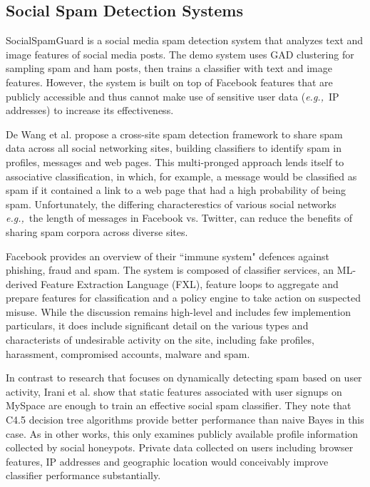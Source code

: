 \documentclass[preprint]{acm_proc_article-sp}
\newcommand{\eg}{{\em e.g.,}~}
\begin{document}
\subsection{Social Spam Detection Systems}

SocialSpamGuard \cite{jin} is a social media spam detection system that analyzes text and image features of social media posts. The demo system uses GAD clustering \cite{jingad} for sampling spam and ham posts, then trains a classifier with text and image features. However, the system is built on top of Facebook features that are publicly accessible and thus cannot make use of sensitive user data (\eg IP addresses) to increase its effectiveness. 

De Wang et al. \cite{wang} propose a cross-site spam detection framework to share spam data across all social networking sites, building classifiers to identify spam in profiles, messages and web pages. This multi-pronged approach lends itself to associative classification, in which, for example, a message would be classified as spam if it contained a link to a web page that had a high probability of being spam. Unfortunately, the differing characterestics of various social networks \eg the length of messages in Facebook vs. Twitter, can reduce the benefits of sharing spam corpora across diverse sites.

Facebook \cite{stein} provides an overview of their ``immune system" defences against phishing, fraud and spam. The system is composed of classifier services, an ML-derived Feature Extraction Language (FXL), feature loops to aggregate and prepare features for classification and a policy engine to take action on suspected misuse. While the discussion remains high-level and includes few implemention particulars, it does include significant detail on the various types and characterists of undesirable activity on the site, including fake profiles, harassment, compromised accounts, malware and spam. 

In contrast to research that focuses on dynamically detecting spam based on user activity, Irani et al. \cite{irani} show that static features associated with user signups on MySpace are enough to train an effective social spam classifier. They note that C4.5 decision tree algorithms provide better performance than naive Bayes in this case. As in other works, this only examines publicly available profile information collected by social honeypots. Private data collected on users including browser features, IP addresses and geographic location would conceivably improve classifier performance substantially.
\end{document}
